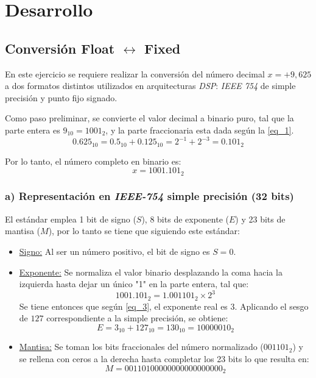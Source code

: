 \documentclass[12pt,a4paper]{article}
\begin{document}
\section{Desarrollo}                                                \label{sec_2}
\subsection{Conversión Float $\longleftrightarrow$ Fixed}           \label{sec_2.1}
En este ejercicio se requiere realizar la conversión del número decimal $x = +9,625$ a dos formatos distintos utilizados en arquitecturas \textit{DSP}: \textit{IEEE 754} de simple precisión y punto fijo signado.

Como paso preliminar, se convierte el valor decimal a binario puro, tal que la parte entera es $9_{10} = 1001_{2}$, y la parte fraccionaria esta dada según la \autoref{eq_1}.
\begin{equation}
    0.625_{10} = 0.5_{10} + 0.125_{10} = 2^{-1} + 2^{-3} = 0.101_{2}
    \label{eq_1}
\end{equation}

Por lo tanto, el número completo en binario es:
\begin{equation}
    x = 1001.101_{2}
    \label{eq_2}
\end{equation}


\subsubsection*{a) Representación en \textit{IEEE-754} simple precisión (32 bits)}
El estándar emplea 1 bit de signo ($S$), 8 bits de exponente ($E$) y 23 bits de mantisa ($M$), por lo tanto se tiene que siguiendo este estándar:
\begin{itemize}
    \item \underline{Signo:} Al ser un número positivo, el bit de signo es $S = 0$.
    
    \item \underline{Exponente:} Se normaliza el valor binario desplazando la coma hacia la izquierda hasta dejar un único "1" en la parte entera, tal que:
    \begin{equation}
        1001.101_{2} = 1.001101_{2} \times 2^{3}
        \label{eq_3}
    \end{equation}
    Se tiene entonces que según \autoref{eq_3}, el exponente real es 3. Aplicando el sesgo de $127$ correspondiente a la simple precisión, se obtiene:
    \begin{equation}
        E = 3_{10} + 127_{10} = 130_{10} = 10000010_{2}
        \label{eq_4}
    \end{equation}
    
    \item \underline{Mantisa:} Se toman los bits fraccionales del número normalizado ($001101_{2}$) y se rellena con ceros a la derecha hasta completar los 23 bits lo que resulta en: 
    \begin{equation}
        M = 00110100000000000000000_{2}
        \label{eq_5}
    \end{equation}
\end{itemize}
\end{document}
